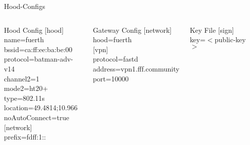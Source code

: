 \begin{frame}{Hood-Configs}
    \begin{columns}
        \begin{block}{Hood Config}
            \footnotesize
            [hood]\\
            name=fuerth\\
            bssid=ca:ff:ee:ba:be:00\\
            protocol=batman-adv-v14\\
            channel2=1\\
            mode2=ht20+\\
            type=802.11s\\
            location=49.4814;10.966\\
            noAutoConnect=true\\[1ex]
            [network]\\
            prefix=fdff:1::
        \end{block}
        \begin{block}{Gateway Config}
            \footnotesize
            [network]\\
            hood=fuerth\\[1ex]
            [vpn]\\
            protocol=fastd\\
            address=vpn1.fff.community\\
            port=10000\\
        \end{block}
        \begin{block}{Key File}
            \footnotesize
            [sign]\\
            key=$<$public-key$>$\\
        \end{block}
    \end{columns}
\end{frame}

